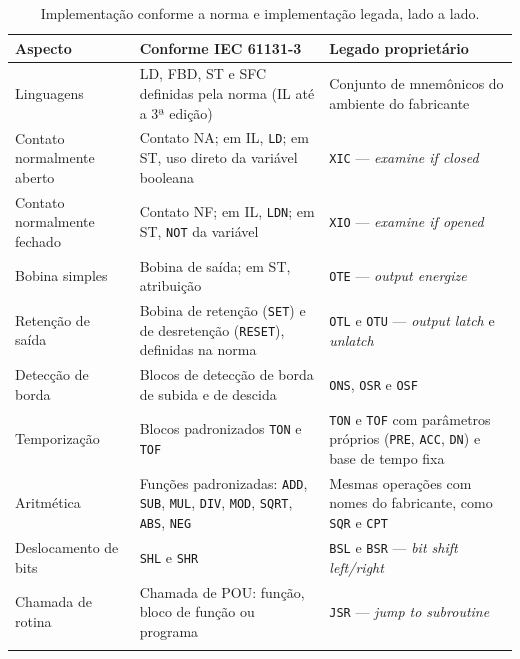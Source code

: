 \begin{table}[H]
  \centering
  \caption{Implementação conforme a norma e implementação legada, lado a lado.}
  \label{tab:iec-versus-legado}
  \begin{tabular}{p{3.0cm} p{5.6cm} p{6.0cm}}
    \toprule
    Aspecto & Conforme IEC 61131-3 & Legado proprietário \\
    \midrule
    Linguagens
      & LD, FBD, ST e SFC definidas pela norma (IL até a 3ª edição)
      & Conjunto de mnemônicos do ambiente do fabricante \\
    \addlinespace
    Contato normalmente aberto
      & Contato NA; em IL, \texttt{LD}; em ST, uso direto da variável booleana
      & \texttt{XIC} --- \emph{examine if closed} \\
    \addlinespace
    Contato normalmente fechado
      & Contato NF; em IL, \texttt{LDN}; em ST, \texttt{NOT} da variável
      & \texttt{XIO} --- \emph{examine if opened} \\
    \addlinespace
    Bobina simples
      & Bobina de saída; em ST, atribuição
      & \texttt{OTE} --- \emph{output energize} \\
    \addlinespace
    Retenção de saída
      & Bobina de retenção (\texttt{SET}) e de desretenção (\texttt{RESET}), definidas na norma
      & \texttt{OTL} e \texttt{OTU} --- \emph{output latch} e \emph{unlatch} \\
    \addlinespace
    Detecção de borda
      & Blocos de detecção de borda de subida e de descida
      & \texttt{ONS}, \texttt{OSR} e \texttt{OSF} \\
    \addlinespace
    Temporização
      & Blocos padronizados \texttt{TON} e \texttt{TOF}
      & \texttt{TON} e \texttt{TOF} com parâmetros próprios (\texttt{PRE}, \texttt{ACC}, \texttt{DN})
        e base de tempo fixa \\
    \addlinespace
    Aritmética
      & Funções padronizadas: \texttt{ADD}, \texttt{SUB}, \texttt{MUL}, \texttt{DIV}, \texttt{MOD},
        \texttt{SQRT}, \texttt{ABS}, \texttt{NEG}
      & Mesmas operações com nomes do fabricante, como \texttt{SQR} e \texttt{CPT} \\
    \addlinespace
    Deslocamento de bits
      & \texttt{SHL} e \texttt{SHR}
      & \texttt{BSL} e \texttt{BSR} --- \emph{bit shift left/right} \\
    \addlinespace
    Chamada de rotina
      & Chamada de POU: função, bloco de função ou programa
      & \texttt{JSR} --- \emph{jump to subroutine} \\
    \addlinespace

\end{tabular}
\end{table}
